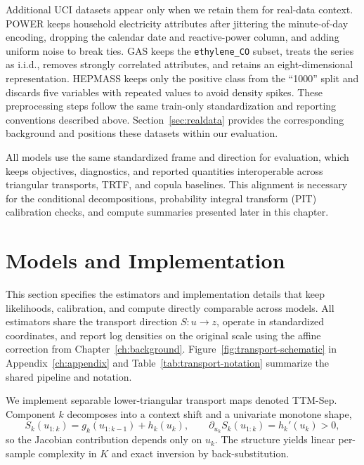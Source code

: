 \documentclass[11pt,a4paper,twoside]{book}\usepackage[]{graphicx}\usepackage[]{xcolor}
\begin{document}
Additional UCI datasets appear only when we retain them for real-data context. POWER keeps household electricity attributes after jittering the minute-of-day encoding, dropping the calendar date and reactive-power column, and adding uniform noise to break ties. GAS keeps the \texttt{ethylene\_CO} subset, treats the series as i.i.d., removes strongly correlated attributes, and retains an eight-dimensional representation. HEPMASS keeps only the positive class from the ``1000'' split and discards five variables with repeated values to avoid density spikes. These preprocessing steps follow the same train-only standardization and reporting conventions described above. Section~\ref{sec:realdata} provides the corresponding background and positions these datasets within our evaluation.

All models use the same standardized frame and direction for evaluation, which keeps objectives, diagnostics, and reported quantities interoperable across triangular transports, TRTF, and copula baselines. This alignment is necessary for the conditional decompositions, probability integral transform (PIT) calibration checks, and compute summaries presented later in this chapter.

\section{Models and Implementation}\label{sec:models-implementation}

This section specifies the estimators and implementation details that keep likelihoods, calibration, and compute directly comparable across models. All estimators share the transport direction $S:u \rightarrow z$, operate in standardized coordinates, and report log densities on the original scale using the affine correction from Chapter~\ref{ch:background}. Figure~\ref{fig:transport-schematic} in Appendix~\ref{ch:appendix} and Table~\ref{tab:transport-notation} summarize the shared pipeline and notation.

We implement separable lower-triangular transport maps denoted TTM-Sep. Component $k$ decomposes into a context shift and a univariate monotone shape,
\begin{equation}
  S_k(u_{1:k}) = g_k(u_{1:k-1}) + h_k(u_k), \qquad \partial_{u_k} S_k(u_{1:k}) = h_k'(u_k) > 0,
  \label{eq:ttm-separable-def}
\end{equation}
so the Jacobian contribution depends only on $u_k$. The structure yields linear per-sample complexity in $K$ and exact inversion by back-substitution.
\end{document}
